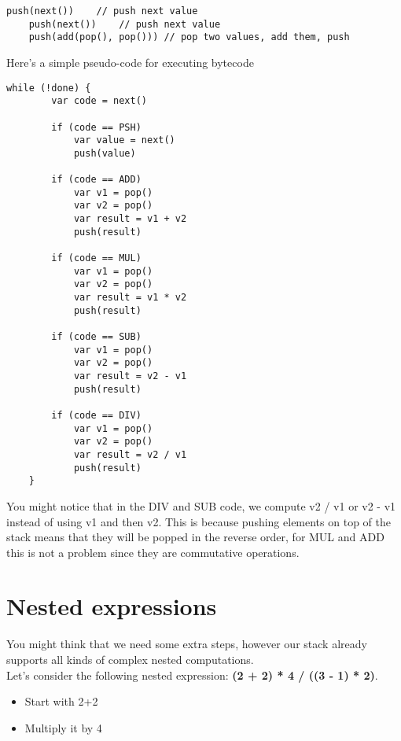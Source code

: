 \documentclass{article}
\begin{document}
\begin{lstlisting}[style=generic]
    push(next())    // push next value
    push(next())    // push next value
    push(add(pop(), pop())) // pop two values, add them, push
\end{lstlisting}

\pagebreak

Here's a simple pseudo-code for executing bytecode

\begin{lstlisting}[style=generic]
    while (!done) {
        var code = next()
    
        if (code == PSH)
            var value = next()
            push(value)
    
        if (code == ADD)
            var v1 = pop()
            var v2 = pop()
            var result = v1 + v2
            push(result)
    
        if (code == MUL)
            var v1 = pop()
            var v2 = pop()
            var result = v1 * v2
            push(result)
    
        if (code == SUB)
            var v1 = pop()
            var v2 = pop()
            var result = v2 - v1
            push(result)
    
        if (code == DIV)
            var v1 = pop()
            var v2 = pop()
            var result = v2 / v1
            push(result)
    }
\end{lstlisting}

You might notice that in the DIV and SUB code, we compute v2 / v1 or v2 - v1 instead of using v1 and then v2.
This is because pushing elements on top of the stack means that they will be popped in the reverse order, for MUL and ADD
this is not a problem since they are commutative operations.

\pagebreak

\section{Nested expressions}

You might think that we need some extra steps, however our stack already supports all kinds of complex nested computations.
\\
Let's consider the following nested expression: \textbf{(2 + 2) * 4 / ((3 - 1) * 2)}.

\begin{itemize}
    \item Start with 2+2
    \item Multiply it by 4
\end{itemize}
\end{document}
